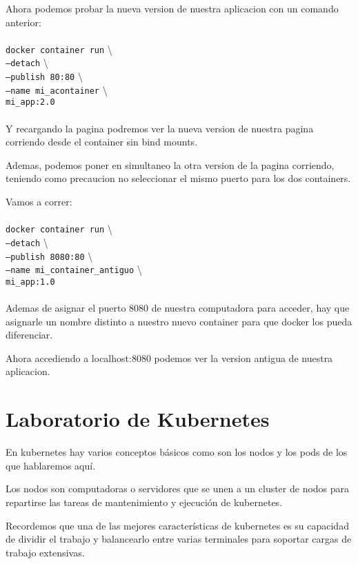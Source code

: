 \documentclass[11pt]{article} %
\begin{document}
Ahora podemos probar la nueva version de nuestra aplicacion con un comando anterior: \\ \\
	\texttt{docker container run}  \textbackslash \\
	\texttt{--detach}  \textbackslash \\
	\texttt{--publish 80:80} \textbackslash \\
	\texttt{--name mi\_acontainer}  \textbackslash \\
	\texttt{mi\_app:2.0} \\ \\

Y recargando la pagina podremos ver la nueva version de nuestra pagina corriendo desde el container sin bind mounts. 

Ademas, podemos poner en simultaneo la otra version de la pagina corriendo, teniendo como precaucion no seleccionar el mismo puerto para los dos containers.

Vamos a correr: \\ \\
	\texttt{docker container run}  \textbackslash \\
	\texttt{--detach}  \textbackslash \\
	\texttt{--publish 8080:80}  \textbackslash \\
	\texttt{--name mi\_container\_antiguo}  \textbackslash \\
	\texttt{mi\_app:1.0} \\ \\

Ademas de asignar el puerto 8080 de nuestra computadora para acceder, hay que asignarle un nombre distinto a nuestro nuevo container para que docker los pueda diferenciar.

Ahora accediendo a localhost:8080 podemos ver la version antigua de nuestra aplicacion.



\section{Laboratorio de Kubernetes}

En kubernetes hay varios conceptos básicos como son los nodos y los pods de los que hablaremos aquí.

Los nodos son computadoras o servidores que se unen a un cluster de nodos para repartirse las tareas de mantenimiento y ejecución de kubernetes.

Recordemos que una de las mejores características de kubernetes es su capacidad de dividir el trabajo y balancearlo entre varias terminales para soportar cargas de trabajo extensivas.
\end{document}
